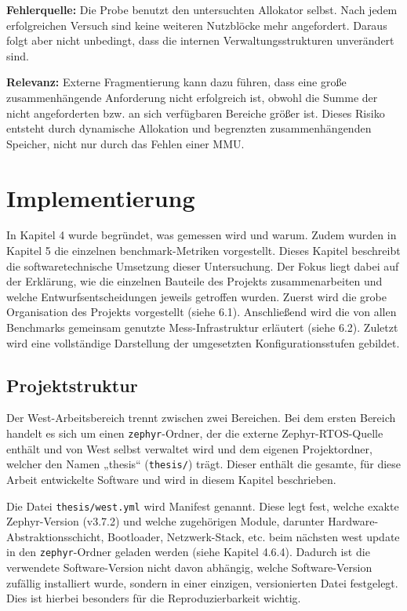\textbf{Fehlerquelle:} Die Probe benutzt den untersuchten Allokator selbst. Nach jedem erfolgreichen Versuch sind keine weiteren Nutzblöcke mehr angefordert. Daraus folgt aber nicht unbedingt, dass die internen Verwaltungsstrukturen unverändert sind.

\textbf{Relevanz:} Externe Fragmentierung kann dazu führen, dass eine große zusammenhängende Anforderung nicht erfolgreich ist, obwohl die Summe der nicht angeforderten bzw. an sich verfügbaren Bereiche größer ist. Dieses Risiko entsteht durch dynamische Allokation und begrenzten zusammenhängenden Speicher, nicht nur durch das Fehlen einer MMU.

\chapter{Implementierung}
In Kapitel 4 wurde begründet, was gemessen wird und warum. Zudem wurden in Kapitel 5 die einzelnen benchmark-Metriken vorgestellt. Dieses Kapitel beschreibt die softwaretechnische Umsetzung dieser Untersuchung. Der Fokus liegt dabei auf der Erklärung, wie die einzelnen Bauteile des Projekts zusammenarbeiten und welche Entwurfsentscheidungen jeweils getroffen wurden. Zuerst wird die grobe Organisation des Projekts vorgestellt (siehe 6.1). Anschließend wird die von allen Benchmarks gemeinsam genutzte Mess-Infrastruktur erläutert (siehe 6.2). Zuletzt wird eine vollständige Darstellung der umgesetzten Konfigurationsstufen gebildet.

\section{Projektstruktur }
Der West-Arbeitsbereich trennt zwischen zwei Bereichen. Bei dem ersten Bereich handelt es sich um einen \lstinline[style=fileinline]|zephyr|-Ordner, der die externe Zephyr-RTOS-Quelle enthält und von West selbst verwaltet wird und dem eigenen Projektordner, welcher den Namen „thesis“ (\lstinline[style=fileinline]|thesis/|) trägt. Dieser enthält die gesamte, für diese Arbeit entwickelte Software und wird in diesem Kapitel beschrieben.

Die Datei \lstinline[style=fileinline]|thesis/west.yml| wird Manifest genannt. Diese legt fest, welche exakte Zephyr-Version (v3.7.2) und welche zugehörigen Module, darunter Hardware-Abstraktionsschicht, Bootloader, Netzwerk-Stack, etc. beim nächsten west update in den \lstinline[style=fileinline]|zephyr|-Ordner geladen werden (siehe Kapitel 4.6.4). Dadurch ist die verwendete Software-Version nicht davon abhängig, welche Software-Version zufällig installiert wurde, sondern in einer einzigen, versionierten Datei festgelegt. Dies ist hierbei besonders für die Reproduzierbarkeit wichtig.


